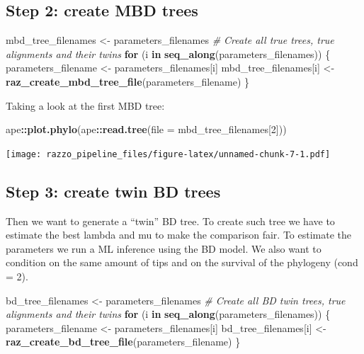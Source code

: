 \documentclass[]{article}
\newenvironment{Shaded}{\begin{snugshade}}{\end{snugshade}}
\newcommand{\KeywordTok}[1]{\textcolor[rgb]{0.13,0.29,0.53}{\textbf{#1}}}
\newcommand{\DataTypeTok}[1]{\textcolor[rgb]{0.13,0.29,0.53}{#1}}
\newcommand{\DecValTok}[1]{\textcolor[rgb]{0.00,0.00,0.81}{#1}}
\newcommand{\StringTok}[1]{\textcolor[rgb]{0.31,0.60,0.02}{#1}}
\newcommand{\CommentTok}[1]{\textcolor[rgb]{0.56,0.35,0.01}{\textit{#1}}}
\newcommand{\ControlFlowTok}[1]{\textcolor[rgb]{0.13,0.29,0.53}{\textbf{#1}}}
\newcommand{\OperatorTok}[1]{\textcolor[rgb]{0.81,0.36,0.00}{\textbf{#1}}}
\newcommand{\NormalTok}[1]{#1}
\begin{document}
\subsection{Step 2: create MBD trees}\label{step-2-create-mbd-trees}

\begin{Shaded}
\begin{Highlighting}[]
\NormalTok{mbd_tree_filenames <-}\StringTok{ }\NormalTok{parameters_filenames}
\CommentTok{# Create all true trees, true alignments and their twins}
\ControlFlowTok{for}\NormalTok{ (i }\ControlFlowTok{in} \KeywordTok{seq_along}\NormalTok{(parameters_filenames)) \{}
\NormalTok{  parameters_filename <-}\StringTok{ }\NormalTok{parameters_filenames[i]}
\NormalTok{  mbd_tree_filenames[i] <-}\StringTok{ }\KeywordTok{raz_create_mbd_tree_file}\NormalTok{(parameters_filename)}
\NormalTok{\}}
\end{Highlighting}
\end{Shaded}

Taking a look at the first MBD tree:

\begin{Shaded}
\begin{Highlighting}[]
\NormalTok{ape}\OperatorTok{::}\KeywordTok{plot.phylo}\NormalTok{(ape}\OperatorTok{::}\KeywordTok{read.tree}\NormalTok{(}\DataTypeTok{file =}\NormalTok{ mbd_tree_filenames[}\DecValTok{2}\NormalTok{]))}
\end{Highlighting}
\end{Shaded}

\texttt{[image: razzo\_pipeline\_files/figure-latex/unnamed-chunk-7-1.pdf]}

\subsection{Step 3: create twin BD
trees}\label{step-3-create-twin-bd-trees}

Then we want to generate a ``twin'' BD tree. To create such tree we have
to estimate the best lambda and mu to make the comparison fair. To
estimate the parameters we run a ML inference using the BD model. We
also want to condition on the same amount of tips and on the survival of
the phylogeny (cond = 2).

\begin{Shaded}
\begin{Highlighting}[]
\NormalTok{bd_tree_filenames <-}\StringTok{ }\NormalTok{parameters_filenames}
\CommentTok{# Create all BD twin trees, true alignments and their twins}
\ControlFlowTok{for}\NormalTok{ (i }\ControlFlowTok{in} \KeywordTok{seq_along}\NormalTok{(parameters_filenames)) \{}
\NormalTok{  parameters_filename <-}\StringTok{ }\NormalTok{parameters_filenames[i]}
\NormalTok{  bd_tree_filenames[i] <-}\StringTok{ }\KeywordTok{raz_create_bd_tree_file}\NormalTok{(parameters_filename)}
\NormalTok{\}}
\end{Highlighting}
\end{Shaded}
\end{document}
